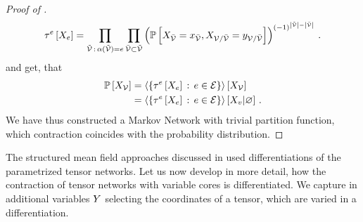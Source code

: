 \begin{proof}[Proof of ]
\begin{align*}
        \tau^{e}\left[X_{e}\right] = \prod_{\tilde{\mathcal{V}} \,:\, \alpha(\tilde{\mathcal{V}}) = e} \prod_{\bar{\mathcal{V}}\subset\tilde{\mathcal{V}}}
        \left(
        \mathbb{P}\left[X_{\bar{\mathcal{V}}}=x_{\bar{\mathcal{V}}},X_{\mathcal{V}/\bar{\mathcal{V}}}=y_{\mathcal{V}/\bar{\mathcal{V}}}\right]
        \right)^{(-1)^{\left|\tilde{\mathcal{V}}\right|-\left|\bar{\mathcal{V}}\right|}} \, .
    \end{align*}
    and get, that
    \begin{align*}
        \mathbb{P}\left[X_{\mathcal{V}}\right] & = \left\langle \left\{\tau^{e}\left[X_{e}\right]\,:\,e\in\mathcal{E}\right\}\right\rangle \left[ X_{\mathcal{V}} \right] \\
        & = \left\langle \left\{\tau^{e}\left[X_{e}\right]\,:\,e\in\mathcal{E}\right\}\right\rangle \left[ X_{v} | \varnothing \right] \, .
    \end{align*}
    We have thus constructed a Markov Network with trivial partition function, which contraction coincides with the probability distribution.
\end{proof}


The structured mean field approaches discussed in  used differentiations of the parametrized tensor networks.
Let us now develop in more detail, how the contraction of tensor networks with variable cores is differentiated.
We capture in additional variables $Y$ selecting the coordinates of a tensor, which are varied in a differentiation.

